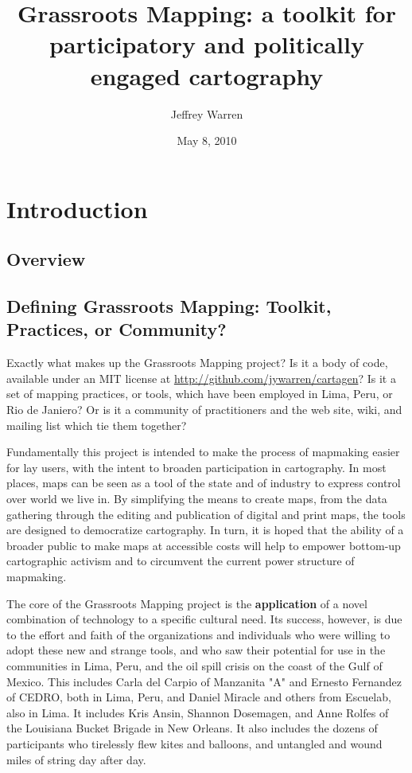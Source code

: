 \documentclass[11pt]{report}
\title{Grassroots Mapping: a toolkit for participatory and politically engaged cartography}
\author{Jeffrey Warren}
\date{May 8, 2010}
\begin{document}
\maketitle

\chapter{Introduction}
\section{Overview}
\section{Defining Grassroots Mapping: Toolkit, Practices, or Community?}

Exactly what makes up the Grassroots Mapping project? Is it a body of code, available under an MIT license at \url{http://github.com/jywarren/cartagen}? Is it a set of mapping practices, or tools, which have been employed in Lima, Peru, or Rio de Janiero? Or is it a community of practitioners and the web site, wiki, and mailing list which tie them together?

Fundamentally this project is intended to make the process of mapmaking easier for lay users, with the intent to broaden participation in cartography. In most places, maps can be seen as a tool of the state and of industry to express control over world we live in. By simplifying the means to create maps, from the data gathering through the editing and publication of digital and print maps, the tools are designed to democratize cartography. In turn, it is hoped that the ability of a broader public to make maps at accessible costs will help to empower bottom-up cartographic activism and to circumvent the current power structure of mapmaking. 

The core of the Grassroots Mapping project is the \textbf{application} of a novel combination of technology to a specific cultural need. Its success, however, is due to the effort and faith of the organizations and individuals who were willing to adopt these new and strange tools, and who saw their potential for use in the communities in Lima, Peru, and the oil spill crisis on the coast of the Gulf of Mexico. This includes Carla del Carpio of Manzanita "A" and Ernesto Fernandez of CEDRO, both in Lima, Peru, and Daniel Miracle and others from Escuelab, also in Lima. It includes Kris Ansin, Shannon Dosemagen, and Anne Rolfes of the Louisiana Bucket Brigade in New Orleans. It also includes the dozens of participants who tirelessly flew kites and balloons, and untangled and wound miles of string day after day.
\end{document}
